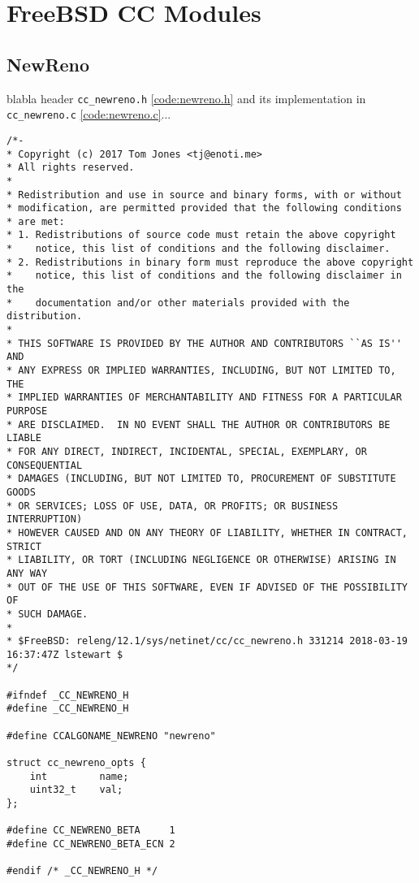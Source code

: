 \chapter{FreeBSD CC Modules} \label{app:freebsd_cc_modules}

\section{NewReno} \label{cc_newreno}


blabla header \lstinline{cc_newreno.h} \ref{code:newreno.h} and its implementation in \lstinline{cc_newreno.c} \ref{code:newreno.c}...



\begin{code}
\begin{verbatim}
/*-
* Copyright (c) 2017 Tom Jones <tj@enoti.me>
* All rights reserved.
*
* Redistribution and use in source and binary forms, with or without
* modification, are permitted provided that the following conditions
* are met:
* 1. Redistributions of source code must retain the above copyright
*    notice, this list of conditions and the following disclaimer.
* 2. Redistributions in binary form must reproduce the above copyright
*    notice, this list of conditions and the following disclaimer in the
*    documentation and/or other materials provided with the distribution.
*
* THIS SOFTWARE IS PROVIDED BY THE AUTHOR AND CONTRIBUTORS ``AS IS'' AND
* ANY EXPRESS OR IMPLIED WARRANTIES, INCLUDING, BUT NOT LIMITED TO, THE
* IMPLIED WARRANTIES OF MERCHANTABILITY AND FITNESS FOR A PARTICULAR PURPOSE
* ARE DISCLAIMED.  IN NO EVENT SHALL THE AUTHOR OR CONTRIBUTORS BE LIABLE
* FOR ANY DIRECT, INDIRECT, INCIDENTAL, SPECIAL, EXEMPLARY, OR CONSEQUENTIAL
* DAMAGES (INCLUDING, BUT NOT LIMITED TO, PROCUREMENT OF SUBSTITUTE GOODS
* OR SERVICES; LOSS OF USE, DATA, OR PROFITS; OR BUSINESS INTERRUPTION)
* HOWEVER CAUSED AND ON ANY THEORY OF LIABILITY, WHETHER IN CONTRACT, STRICT
* LIABILITY, OR TORT (INCLUDING NEGLIGENCE OR OTHERWISE) ARISING IN ANY WAY
* OUT OF THE USE OF THIS SOFTWARE, EVEN IF ADVISED OF THE POSSIBILITY OF
* SUCH DAMAGE.
*
* $FreeBSD: releng/12.1/sys/netinet/cc/cc_newreno.h 331214 2018-03-19 16:37:47Z lstewart $
*/

#ifndef _CC_NEWRENO_H
#define _CC_NEWRENO_H

#define CCALGONAME_NEWRENO "newreno"

struct cc_newreno_opts {
    int			name;
    uint32_t	val;
};

#define CC_NEWRENO_BETA		1
#define CC_NEWRENO_BETA_ECN	2

#endif /* _CC_NEWRENO_H */
\end{verbatim}
\label{code:newreno.h}
\end{code}

